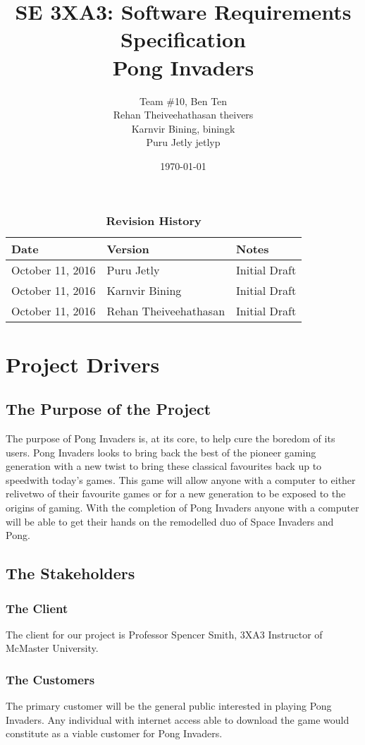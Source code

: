 \documentclass[12pt, titlepage]{article}
\title{SE 3XA3: Software Requirements Specification\\Pong Invaders}
\author{Team \#10, Ben Ten
		\\ Rehan Theiveehathasan theivers
		\\ Karnvir Bining, biningk 
		\\ Puru Jetly jetlyp
}
\date{\today}
\begin{document}
\maketitle
{}
\tableofcontents
\listoftables
\listoffigures
\begin{table}[bp]
\caption{\bf Revision History}
\begin{tabularx}{\textwidth}{p{3cm}p{2cm}X}
\toprule {\bf Date} & {\bf Version} & {\bf Notes}\\
\midrule
October 11, 2016  & Puru Jetly & Initial Draft\\
October 11, 2016  & Karnvir Bining & Initial Draft\\
October 11, 2016  & Rehan Theiveehathasan & Initial Draft\\
\bottomrule
\end{tabularx}
\end{table}
\newpage
{}
\section{Project Drivers}
\subsection{The Purpose of the Project}
The purpose of Pong Invaders is, at its core, to help cure the boredom of its
users. Pong Invaders looks to bring back the best of the pioneer gaming
generation with a new twist to bring these classical favourites back up to
speedwith today’s games. This game will allow anyone with a computer to either
relivetwo of their favourite games or for a new generation to be exposed to the
origins of gaming. With the completion of Pong Invaders anyone with a computer
will be able to get their hands on the remodelled duo of Space Invaders and
Pong.
\subsection{The Stakeholders}
\subsubsection{The Client}
The client for our project is Professor Spencer Smith, 3XA3 Instructor of
McMaster University.
\subsubsection{The Customers}
The primary customer will be the general public interested in playing Pong
Invaders. Any individual with internet access able to download the game would
constitute as a viable customer for Pong Invaders.
\end{document}
